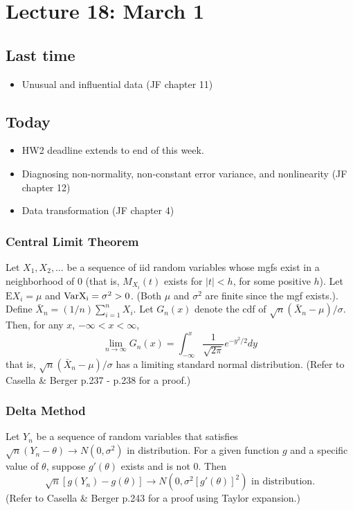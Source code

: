 \setcounter{section}{17}


\section{Lecture 18: March 1}


\subsection*{Last time}
\begin{itemize}
 \item Unusual and influential data (JF chapter 11)
\end{itemize}


\subsection*{Today}
\begin{itemize}
 \item HW2 deadline extends to end of this week.
 \item Diagnosing non-normality, non-constant error variance, and nonlinearity (JF chapter 12)
 \item Data transformation (JF chapter 4)
\end{itemize}


\subsubsection*{Central Limit Theorem}
Let $X_1, X_2, \dots$ be a sequence of iid random variables whose mgfs exist in a neighborhood of $0$ (that is, $M_{X_i}(t)$ exists for $|t| < h$, for some positive $h$).
Let $\mbox{E}{X_i}=\mu$ and $\rm Var{X_i}=\sigma^2 >0$. (Both $\mu$ and $\sigma^2$ are finite since the mgf exists.). Define $\bar{X}_n = (1/n)\sum\limits_{i = 1}^n X_i$.
Let $G_n(x)$ denote the cdf of $\sqrt{n} (\bar{X}_n - \mu)/\sigma$.
Then, for any $x$, $-\infty < x < \infty$,
$$
\lim\limits_{n \to \infty} G_n(x) = \int_{-\infty}^x \frac{1}{\sqrt{2\pi}} e^{-y^2/2}dy
$$
that is, $\sqrt{n}(\bar{X}_n - \mu)/\sigma$ has a limiting standard normal distribution.
(Refer to Casella \& Berger p.237 - p.238 for a proof.)

\subsubsection*{Delta Method}
Let $Y_n$ be a sequence of random variables that satisfies $\sqrt{n} (Y_n - \theta) \to N(0, \sigma^2)$ in distribution.
For a given function $g$ and a specific value of $\theta$, suppose $g'(\theta)$ exists and is not $0$.  Then
$$
\sqrt{n} [ g(Y_n) - g(\theta) ] \to N(0, \sigma^2 [g'(\theta)]^2) \mbox{ in distribution}.
$$
(Refer to Casella \& Berger p.243 for a proof using Taylor expansion.)

